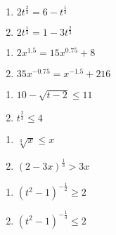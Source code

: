 \documentclass{ximera}
\begin{document}
\begin{multicols}{2}
\begin{enumerate}
\setcounter{enumi}{\value{HW}}

\item  $2t^{\frac{2}{3}} = 6 - t^{\frac{1}{3}}$  %
\item  $2t^{\frac{1}{3}} = 1-3t^{\frac{2}{3}} $  %

\setcounter{HW}{\value{enumi}}
\end{enumerate}
\end{multicols}

\begin{multicols}{2}
\begin{enumerate}
\setcounter{enumi}{\value{HW}}

\item $2x^{1.5} = 15x^{0.75} + 8$  %

\item  $35x^{-0.75} = x^{-1.5} +216$ %

\setcounter{HW}{\value{enumi}}
\end{enumerate}
\end{multicols}

\begin{multicols}{2}
\begin{enumerate}
\setcounter{enumi}{\value{HW}}


\item  $10-\sqrt{t-2} \leq 11$ 
\item  $t^{\frac{2}{3}} \leq 4$ %

\setcounter{HW}{\value{enumi}}
\end{enumerate}
\end{multicols}

\begin{multicols}{2}
\begin{enumerate}
\setcounter{enumi}{\value{HW}}


\item  $\sqrt[3]{x} \leq x$   
\item  $(2-3x)^{\frac{1}{3}} > 3x$  %

\setcounter{HW}{\value{enumi}}
\end{enumerate}
\end{multicols}

\begin{multicols}{2}
\begin{enumerate}
\setcounter{enumi}{\value{HW}}


\item  $(t^2-1)^{-\frac{1}{2}} \geq 2$  %
\item   $(t^2-1)^{-\frac{1}{3}} \leq 2$  %

\setcounter{HW}{\value{enumi}}
\end{enumerate}
\end{multicols}
\end{document}
